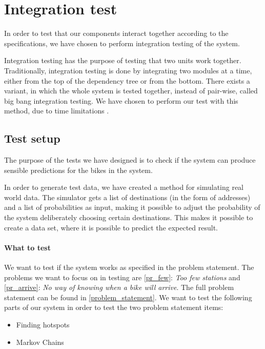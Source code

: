 \section{Integration test}

In order to test that our components interact together according to the specifications, we have chosen to perform integration testing of the system.

Integration testing has the purpose of testing that two units work together. 
Traditionally, integration testing is done by integrating two modules at a time, either from the top of the dependency tree or from the bottom.
There exists a variant, in which the whole system is tested together, instead of pair-wise, called big bang integration testing.
We have chosen to perform our test with this method, due to time limitations \cite{inttest}.

\subsection{Test setup}
The purpose of the tests we have designed is to check if the system can produce sensible predictions for the bikes in the system.

In order to generate test data, we have created a method for simulating real world data. 
The simulator gets a list of destinations (in the form of addresses) and a list of probabilities as input, making it possible to adjust the probability of the system deliberately choosing certain destinations.
This makes it possible to create a data set, where it is possible to predict the expected result.

\paragraph{What to test}
We want to test if the system works as specified in the problem statement.
The problems we want to focus on in testing are \ref{pr_few}: \textit{Too few stations} and \ref{pr_arrive}: \textit{No way of knowing when a bike will arrive}. 
The full problem statement can be found in \cref{problem_statement}.
We want to test the following parts of our system in order to test the two problem statement items:

\begin{itemize}
\item Finding hotspots 
\item Markov Chains
\end{itemize}

